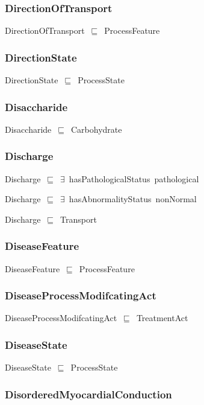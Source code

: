 \documentclass{article}
\begin{document}
\subsubsection*{DirectionOfTransport}

DirectionOfTransport~\ensuremath{\sqsubseteq}~ProcessFeature~

\subsubsection*{DirectionState}

DirectionState~\ensuremath{\sqsubseteq}~ProcessState~

\subsubsection*{Disaccharide}

Disaccharide~\ensuremath{\sqsubseteq}~Carbohydrate~

\subsubsection*{Discharge}

Discharge~\ensuremath{\sqsubseteq}~\ensuremath{\exists}~hasPathologicalStatus~pathological~

Discharge~\ensuremath{\sqsubseteq}~\ensuremath{\exists}~hasAbnormalityStatus~nonNormal~

Discharge~\ensuremath{\sqsubseteq}~Transport~

\subsubsection*{DiseaseFeature}

DiseaseFeature~\ensuremath{\sqsubseteq}~ProcessFeature~

\subsubsection*{DiseaseProcessModifcatingAct}

DiseaseProcessModifcatingAct~\ensuremath{\sqsubseteq}~TreatmentAct~

\subsubsection*{DiseaseState}

DiseaseState~\ensuremath{\sqsubseteq}~ProcessState~

\subsubsection*{DisorderedMyocardialConduction}
\end{document}
